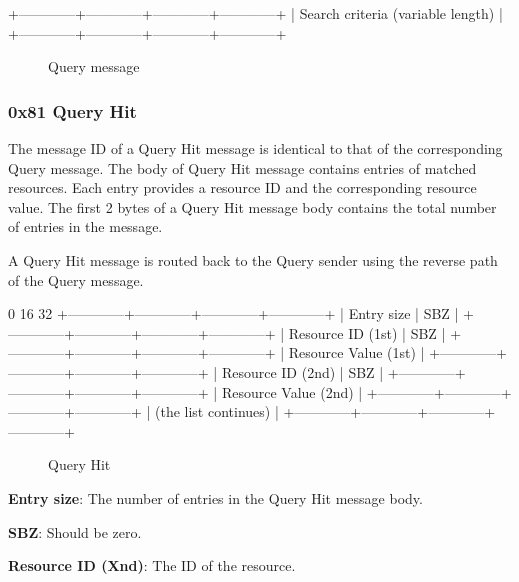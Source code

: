 \documentclass[12pt, a4paper]{article}
\begin{document}
\begin{verbbox}
+------------+------------+------------+------------+
|     Search criteria (variable length)             |
+------------+------------+------------+------------+
\end{verbbox}

\begin{figure}[h!]
  \centering
  \theverbbox
  \label{query}
  \caption{Query message}
\end{figure}


\subsubsection{0x81 Query Hit}
The message ID of a Query Hit message is identical to that of the corresponding Query message.
The body of Query Hit message contains entries of matched resources.
Each entry provides a resource ID and the corresponding resource value.
The first 2 bytes of a Query Hit message body contains the total number of entries in the message.

A Query Hit message is routed back to the Query sender using the reverse path of the Query message.

\begin{verbbox}
0                          16                        32
+------------+------------+------------+------------+
|        Entry size       |           SBZ           |
+------------+------------+------------+------------+
|    Resource ID (1st)    |           SBZ           |
+------------+------------+------------+------------+
|                Resource Value (1st)               |
+------------+------------+------------+------------+
|    Resource ID (2nd)    |           SBZ           |
+------------+------------+------------+------------+
|                Resource Value (2nd)               |
+------------+------------+------------+------------+
|    (the list continues)                           |
+------------+------------+------------+------------+
\end{verbbox}
\begin{figure}[h!]
  \centering
  \theverbbox
  \label{queryhit}
  \caption{Query Hit}
\end{figure}

\textbf{Entry size}: The number of entries in the Query Hit message body.

\textbf{SBZ}: Should be zero.

\textbf{Resource ID (Xnd)}: The ID of the resource.
\end{document}
